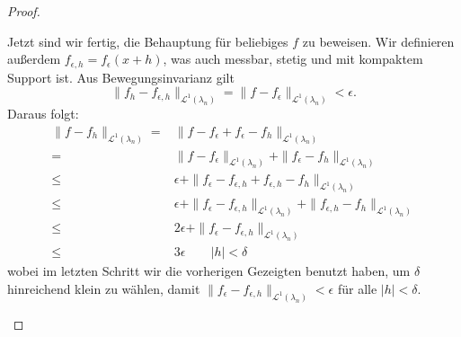 \begin{proof}
\begin{parts}
	Jetzt sind wir fertig, die Behauptung f\"{u}r beliebiges $f$ zu beweisen. Wir definieren außerdem $f_{\epsilon,h}=f_\epsilon(x+h)$, was auch messbar, stetig und mit kompaktem Support ist. Aus Bewegungsinvarianz gilt
\[
	\|f_h-f_{\epsilon,h}\|_{\mathcal{L}^1(\lambda_n)}=\|f-f_\epsilon\|_{\mathcal{L}^1(\lambda_n)}<\epsilon
.\] 
	Daraus folgt:
	\begin{align*}
		\|f-f_h\|_{\mathcal{L}^1(\lambda_n)}=&\|f-f_\epsilon+f_\epsilon-f_h\|_{\mathcal{L}^1(\lambda_n)}\\
		=&\|f-f_\epsilon\|_{\mathcal{L}^1(\lambda_n)}+\|f_\epsilon-f_h\|_{\mathcal{L}^1(\lambda_n)}\\
		\le&\epsilon + \|f_\epsilon-f_{\epsilon,h}+f_{\epsilon,h}-f_h\|_{\mathcal{L}^1(\lambda_n)}\\
		\le&\epsilon+\|f_\epsilon-f_{\epsilon,h}\|_{\mathcal{L}^1(\lambda_n)}+\|f_{\epsilon,h}-f_h\|_{\mathcal{L}^1(\lambda_n)}\\
		\le&2\epsilon+\|f_\epsilon-f_{\epsilon,h}\|_{\mathcal{L}^1(\lambda_n)}\\
		\le&3\epsilon\qquad |h|<\delta
	\end{align*}
	wobei im letzten Schritt wir die vorherigen Gezeigten benutzt haben, um $\delta$ hinreichend klein zu wählen, damit $\|f_\epsilon-f_{\epsilon,h}\|_{\mathcal{L}^1(\lambda_n)}<\epsilon$ f\"{u}r alle $|h|<\delta$.\qedhere
	\end{parts}
\end{proof}
